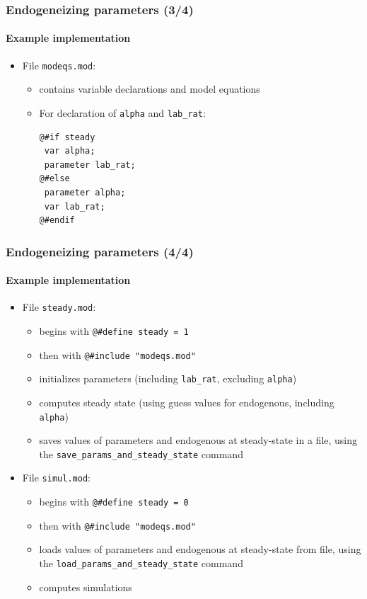 \documentclass{beamer}
\begin{document}
\begin{frame}[fragile=singleslide]
  \frametitle{Endogeneizing parameters (3/4)}
  \framesubtitle{Example implementation}
  \begin{itemize}
  \item File \texttt{modeqs.mod}:
    \begin{itemize}
    \item contains variable declarations and model equations
    \item For declaration of \texttt{alpha} and \texttt{lab\_rat}:
    \footnotesize
\begin{verbatim}
@#if steady
 var alpha;
 parameter lab_rat;
@#else
 parameter alpha;
 var lab_rat;
@#endif
\end{verbatim}
    \normalsize
    \end{itemize}

  \end{itemize}
\end{frame}

\begin{frame}[fragile=singleslide]
  \frametitle{Endogeneizing parameters (4/4)}
  \framesubtitle{Example implementation}
  \begin{itemize}
  \item File \texttt{steady.mod}:
    \begin{itemize}
    \item begins with \verb+@#define steady = 1+
    \item then with \verb+@#include "modeqs.mod"+
    \item initializes parameters (including \texttt{lab\_rat}, excluding \texttt{alpha})
    \item computes steady state (using guess values for endogenous, including \texttt{alpha})
    \item saves values of parameters and endogenous at steady-state in a file, using the \texttt{save\_params\_and\_steady\_state} command
    \end{itemize}
  \item File \texttt{simul.mod}:
    \begin{itemize}
    \item begins with \verb+@#define steady = 0+
    \item then with \verb+@#include "modeqs.mod"+
    \item loads values of parameters and endogenous at steady-state from file, using the \texttt{load\_params\_and\_steady\_state} command
    \item computes simulations
    \end{itemize}
  \end{itemize}
\end{frame}
\end{document}
